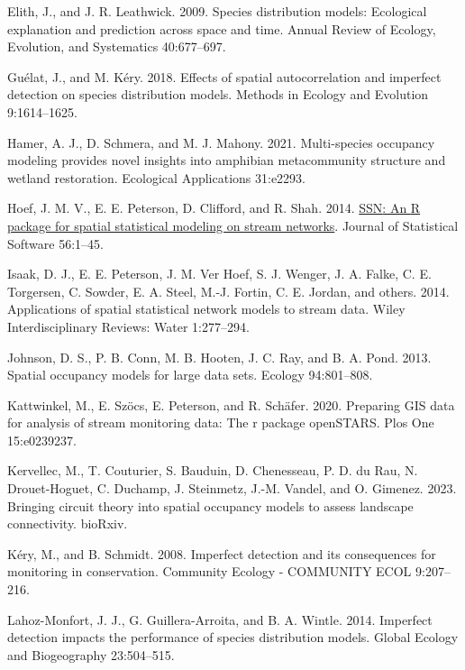 \documentclass[
  11pt,
  a4paper,
]{article}
\newlength{\cslhangindent}
\newenvironment{CSLReferences}[2] %
 {\begin{list}{}{%
  \setlength{\itemindent}{0pt}
  \setlength{\leftmargin}{0pt}
  \setlength{\parsep}{0pt}
  \ifodd #1
   \setlength{\leftmargin}{\cslhangindent}
   \setlength{\itemindent}{-1\cslhangindent}
  \fi
  \setlength{\itemsep}{#2\baselineskip}}}
 {\end{list}}
\begin{document}
\begin{CSLReferences}{1}{0}
Elith, J., and J. R. Leathwick. 2009. Species distribution models: Ecological explanation and prediction across space and time. Annual Review of Ecology, Evolution, and Systematics 40:677--697.

Guélat, J., and M. Kéry. 2018. Effects of spatial autocorrelation and imperfect detection on species distribution models. Methods in Ecology and Evolution 9:1614--1625.

Hamer, A. J., D. Schmera, and M. J. Mahony. 2021. Multi-species occupancy modeling provides novel insights into amphibian metacommunity structure and wetland restoration. Ecological Applications 31:e2293.

Hoef, J. M. V., E. E. Peterson, D. Clifford, and R. Shah. 2014. \href{https://www.jstatsoft.org/article/view/v056i03}{{SSN}: An {R} package for spatial statistical modeling on stream networks}. Journal of Statistical Software 56:1--45.

Isaak, D. J., E. E. Peterson, J. M. Ver Hoef, S. J. Wenger, J. A. Falke, C. E. Torgersen, C. Sowder, E. A. Steel, M.-J. Fortin, C. E. Jordan, and others. 2014. Applications of spatial statistical network models to stream data. Wiley Interdisciplinary Reviews: Water 1:277--294.

Johnson, D. S., P. B. Conn, M. B. Hooten, J. C. Ray, and B. A. Pond. 2013. Spatial occupancy models for large data sets. Ecology 94:801--808.

Kattwinkel, M., E. Szöcs, E. Peterson, and R. Schäfer. 2020. Preparing GIS data for analysis of stream monitoring data: The r package openSTARS. Plos One 15:e0239237.

Kervellec, M., T. Couturier, S. Bauduin, D. Chenesseau, P. D. du Rau, N. Drouet-Hoguet, C. Duchamp, J. Steinmetz, J.-M. Vandel, and O. Gimenez. 2023. Bringing circuit theory into spatial occupancy models to assess landscape connectivity. bioRxiv.

Kéry, M., and B. Schmidt. 2008. Imperfect detection and its consequences for monitoring in conservation. Community Ecology - COMMUNITY ECOL 9:207--216.

Lahoz-Monfort, J. J., G. Guillera-Arroita, and B. A. Wintle. 2014. Imperfect detection impacts the performance of species distribution models. Global Ecology and Biogeography 23:504--515.


\end{CSLReferences}
\end{document}
